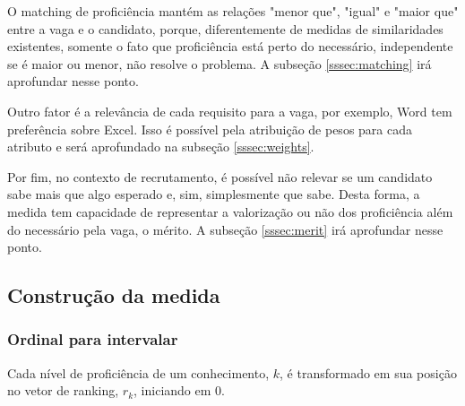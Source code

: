 \documentclass[preprint,12pt]{elsarticle}
\begin{document}
O matching de proficiência mantém as relações "menor que", "igual" e "maior que" entre a vaga e o candidato, porque, diferentemente de medidas de similaridades existentes, somente o fato que proficiência está perto do necessário, independente se é maior ou menor, não resolve o problema. A subseção \ref{sssec:matching} irá aprofundar nesse ponto.

Outro fator é a relevância de cada requisito para a vaga, por exemplo, Word tem preferência sobre Excel. Isso é possível pela atribuição de pesos para cada atributo e será aprofundado na subseção \ref{sssec:weights}.

Por fim, no contexto de recrutamento, é possível não relevar se um candidato sabe mais que algo esperado e, sim, simplesmente que sabe. Desta forma, a medida tem capacidade de representar a valorização ou não dos proficiência além do necessário pela vaga, o mérito. A subseção \ref{sssec:merit} irá aprofundar nesse ponto.





\subsection{Construção da medida}


\subsubsection{Ordinal para intervalar}
\label{sssec:ordinal-interval}
Cada nível de proficiência de um conhecimento, $k$, é transformado em sua posição no vetor de ranking, $r_k$, iniciando em 0.
    
\end{document}
